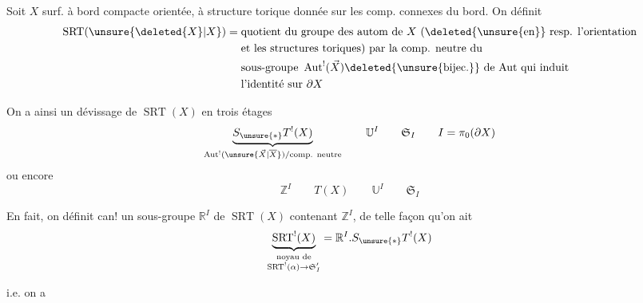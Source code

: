 

Soit $X$ surf. à bord compacte orientée, à structure torique
donnée sur les comp. connexes du bord.
On définit
\[
\begin{aligned}
\operatorname{SRT}(\unsure{\deleted{X}|X})={}&
\text{quotient du groupe des }\text{autom de }X
\text{ (}\text{\deleted{\unsure{en}} resp. }\text{l'orientation}\\
&\text{et les structures toriques) }\text{par la comp. neutre du}\\
&\text{sous-groupe }\operatorname{Aut}^!(\vec X)
\deleted{\unsure{\mathrm{bijec.}}}
\text{ de Aut }\text{qui induit}\\
&\text{l'identité sur }\partial X
\end{aligned}
\]

On a ainsi un dévissage de $\operatorname{SRT}(X)$ en trois étages
\[
\underbrace{S_{\unsure{*}}T^!(X)}_{
\operatorname{Aut}^!(\unsure{\vec X|\overline X})/\text{comp. neutre}}
\qquad\mathbb U^I\qquad\mathfrak S_I
\qquad I=\pi_0(\partial X)
\]
ou encore
\[
\mathbb Z^I\qquad T(X)\qquad\mathbb U^I\qquad\mathfrak S_I
\]

En fait, on définit can! un sous-groupe 
$\mathbb R^I$ de $\operatorname{SRT}(X)$
contenant $\mathbb Z^I$, de telle façon qu'on ait
\[
\underbrace{\operatorname{SRT}^!(X)}_{
\substack{\text{noyau de}\\
\operatorname{SRT}^!(\alpha)\to\mathfrak S_I'}}
=\mathbb R^I.S_{\unsure{*}}T^!(X)
\]


i.e. on a



